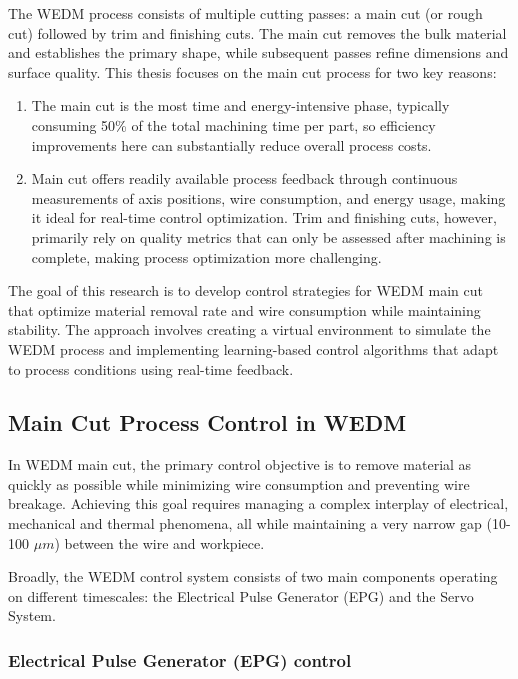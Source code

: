 \documentclass[11pt]{article}
\begin{document}
The WEDM process consists of multiple cutting passes: a main cut (or rough cut) followed by trim and finishing cuts. The main cut removes the bulk material and establishes the primary shape, while subsequent passes refine dimensions and surface quality. This thesis focuses on the main cut process for two key reasons:

\begin{enumerate}
    \item The main cut is the most time and energy-intensive phase, typically consuming 50\% of the total machining time per part, so efficiency improvements here can substantially reduce overall process costs.
    
    \item Main cut offers readily available process feedback through continuous measurements of axis positions, wire consumption, and energy usage, making it ideal for real-time control optimization. Trim and finishing cuts, however, primarily rely on quality metrics that can only be assessed after machining is complete, making process optimization more challenging.
\end{enumerate}


The goal of this research is to develop control strategies for WEDM main cut that optimize material removal rate and wire consumption while maintaining stability. The approach involves creating a virtual environment to simulate the WEDM process and implementing learning-based control algorithms that adapt to process conditions using real-time feedback.

\subsection{Main Cut Process Control in WEDM}

In WEDM main cut, the primary control objective is to remove material as quickly as possible while minimizing wire consumption and preventing wire breakage. Achieving this goal requires managing a complex interplay of electrical, mechanical and thermal phenomena, all while maintaining a very narrow gap (10-100 $\mu m$) between the wire and workpiece. 

Broadly, the WEDM control system consists of two main components operating on different timescales: the Electrical Pulse Generator (EPG) and the Servo System.

\subsubsection{Electrical Pulse Generator (EPG) control}
\end{document}
